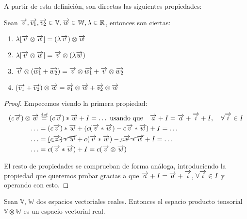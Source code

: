 A partir de esta definición, son directas las siguientes propiedades:

\begin{proposicion} \label{prop:tensores_propiedades}
	Sean $\overrightarrow{v}, \overrightarrow{v_1}, \overrightarrow{v_2} \in \mathbb{V}, \overrightarrow{w} \in \mathbb{W}, \lambda \in \mathbb{R}$, entonces son ciertas:
	\begin{enumerate}
		\item $\lambda [\overrightarrow{v} \otimes \overrightarrow{w}] = (\lambda \overrightarrow{v}) \otimes \overrightarrow{w}$
		\item $\lambda [\overrightarrow{v} \otimes \overrightarrow{w}] = \overrightarrow{v} \otimes (\lambda \overrightarrow{w})$
		\item $\overrightarrow{v} \otimes (\overrightarrow{w_1} + \overrightarrow{w_2}) = \overrightarrow{v} \otimes \overrightarrow{w_1} + \overrightarrow{v} \otimes \overrightarrow{w_2}$
		\item ($\overrightarrow{v_1} + \overrightarrow{v_2}) \otimes \overrightarrow{w} = \overrightarrow{v_1} \otimes \overrightarrow{w} + \overrightarrow{v_2} \otimes \overrightarrow{w}$
	\end{enumerate}
\end{proposicion}

\begin{proof} Empecemos viendo la primera propiedad:
	\begin{equation}
		\begin{split}
			(c\overrightarrow{v}) \otimes \overrightarrow{w} &\stackrel{\text{def}}{=} (c\overrightarrow{v}) \ast \overrightarrow{w} + I = \ldots \ \text{usando que} \quad \overrightarrow{a} + I = \overrightarrow{a} + \overrightarrow{i} + I, \quad \forall \overrightarrow{i} \in I \\
			\ldots &= (c\overrightarrow{v}) \ast \overrightarrow{w} + (c(\overrightarrow{v} \ast \overrightarrow{w}) - c\overrightarrow{v} \ast \overrightarrow{w}) + I = \ldots \\
			\ldots &= \cancel{(c\overrightarrow{v}) \ast \overrightarrow{w}} + c(\overrightarrow{v} \ast \overrightarrow{w}) - \cancel{c\overrightarrow{v} \ast \overrightarrow{w}} + I = \ldots \\
			\ldots &= c(\overrightarrow{v} \ast \overrightarrow{w}) + I = c (\overrightarrow{v} \otimes \overrightarrow{w}) \\
		\end{split}
	\end{equation}

	El resto de propiedades se comprueban de forma análoga, introduciendo la propiedad que queremos probar gracias a que $\overrightarrow{a} + I = \overrightarrow{a} + \overrightarrow{i}$, $\forall \overrightarrow{i} \in I$ y operando con esto.

\end{proof}

\begin{proposicion}
	Sean $\mathbb{V}$, $\mathbb{W}$ dos espacios vectoriales reales. Entonces el espacio producto tensorial $\mathbb{V} \otimes \mathbb{W}$ es un espacio vectorial real.
\end{proposicion}

